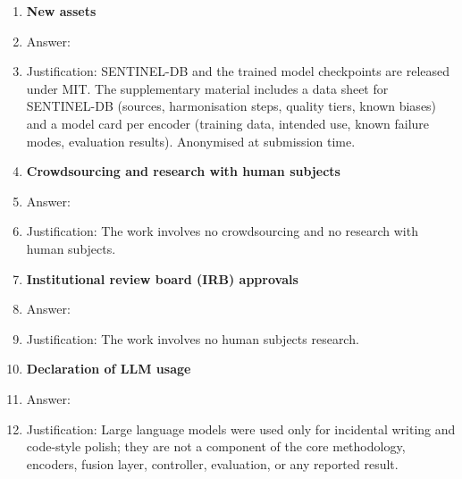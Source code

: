 \begin{enumerate}
\item {\bf New assets}
    \item[] Answer: \answerYes{}
    \item[] Justification: SENTINEL-DB and the trained model checkpoints are released under MIT. The supplementary material includes a data sheet for SENTINEL-DB (sources, harmonisation steps, quality tiers, known biases) and a model card per encoder (training data, intended use, known failure modes, evaluation results). Anonymised at submission time.

\item {\bf Crowdsourcing and research with human subjects}
    \item[] Answer: \answerNA{}
    \item[] Justification: The work involves no crowdsourcing and no research with human subjects.

\item {\bf Institutional review board (IRB) approvals}
    \item[] Answer: \answerNA{}
    \item[] Justification: The work involves no human subjects research.

\item {\bf Declaration of LLM usage}
    \item[] Answer: \answerNA{}
    \item[] Justification: Large language models were used only for incidental writing and code-style polish; they are not a component of the core methodology, encoders, fusion layer, controller, evaluation, or any reported result.

\end{enumerate}
